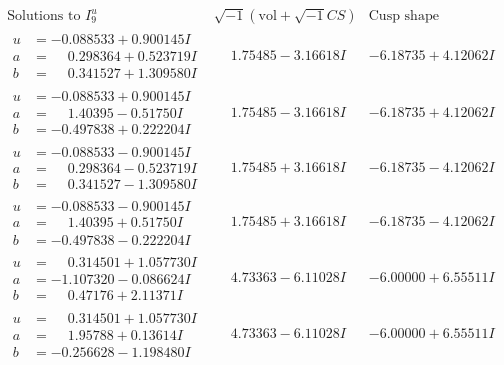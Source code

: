 \documentclass[1p]{elsarticle_modified}
\theoremstyle{definition}
\newcommand{\I}{\sqrt{-1}}
\begin{document}
$$\begin{array}{c|c|c}  
\text{Solutions to }I^u_{9}& \I (\text{vol} + \sqrt{-1}CS) & \text{Cusp shape}\\
 \hline 
\begin{aligned}
u &= -0.088533 + 0.900145 I \\
a &= \phantom{-}0.298364 + 0.523719 I \\
b &= \phantom{-}0.341527 + 1.309580 I\end{aligned}
 & \phantom{-}1.75485 - 3.16618 I & -6.18735 + 4.12062 I \\ \hline\begin{aligned}
u &= -0.088533 + 0.900145 I \\
a &= \phantom{-}1.40395 - 0.51750 I \\
b &= -0.497838 + 0.222204 I\end{aligned}
 & \phantom{-}1.75485 - 3.16618 I & -6.18735 + 4.12062 I \\ \hline\begin{aligned}
u &= -0.088533 - 0.900145 I \\
a &= \phantom{-}0.298364 - 0.523719 I \\
b &= \phantom{-}0.341527 - 1.309580 I\end{aligned}
 & \phantom{-}1.75485 + 3.16618 I & -6.18735 - 4.12062 I \\ \hline\begin{aligned}
u &= -0.088533 - 0.900145 I \\
a &= \phantom{-}1.40395 + 0.51750 I \\
b &= -0.497838 - 0.222204 I\end{aligned}
 & \phantom{-}1.75485 + 3.16618 I & -6.18735 - 4.12062 I \\ \hline\begin{aligned}
u &= \phantom{-}0.314501 + 1.057730 I \\
a &= -1.107320 - 0.086624 I \\
b &= \phantom{-}0.47176 + 2.11371 I\end{aligned}
 & \phantom{-}4.73363 - 6.11028 I & -6.00000 + 6.55511 I \\ \hline\begin{aligned}
u &= \phantom{-}0.314501 + 1.057730 I \\
a &= \phantom{-}1.95788 + 0.13614 I \\
b &= -0.256628 - 1.198480 I\end{aligned}
 & \phantom{-}4.73363 - 6.11028 I & -6.00000 + 6.55511 I \\ \hline\begin{aligned}

\end{aligned}
\end{array}$$
\end{document}
